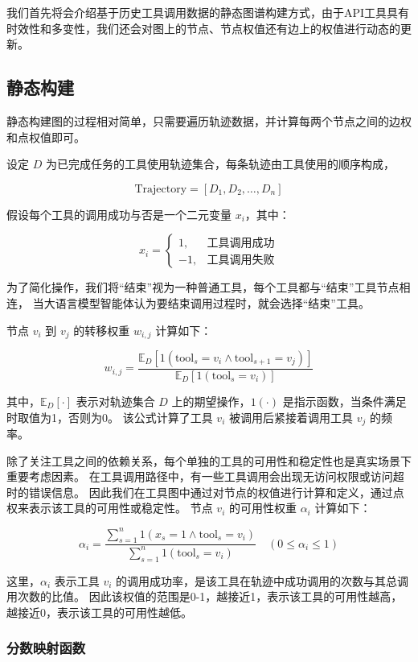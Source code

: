 我们首先将会介绍基于历史工具调用数据的静态图谱构建方式，由于API工具具有时效性和多变性，我们还会对图上的节点、节点权值还有边上的权值进行动态的更新。

\subsection{静态构建}

静态构建图的过程相对简单，只需要遍历轨迹数据，并计算每两个节点之间的边权和点权值即可。

设定 $D$ 为已完成任务的工具使用轨迹集合，每条轨迹由工具使用的顺序构成，

\[
\text{Trajectory} = [D_1, D_2, \ldots, D_n]
\]

假设每个工具的调用成功与否是一个二元变量 $x_i$，其中：

\[
x_i = 
\begin{cases} 
1, & \text{工具调用成功} \\
-1, & \text{工具调用失败}
\end{cases}
\]

为了简化操作，我们将“结束”视为一种普通工具，每个工具都与“结束”工具节点相连，
当大语言模型智能体认为要结束调用过程时，就会选择“结束”工具。

节点 $v_i$ 到 $v_j$ 的转移权重 $w_{i,j}$ 计算如下：

\[
w_{i,j} = \frac{\mathbb{E}_D[1(\text{tool}_s = v_i \land \text{tool}_{s+1} = v_j)]}{\mathbb{E}_D[1(\text{tool}_s = v_i)]}
\]

其中，$\mathbb{E}_D[\cdot]$ 表示对轨迹集合 $D$ 上的期望操作，$1(\cdot)$ 是指示函数，当条件满足时取值为1，否则为0。
该公式计算了工具 $v_i$ 被调用后紧接着调用工具 $v_j$ 的频率。

除了关注工具之间的依赖关系，每个单独的工具的可用性和稳定性也是真实场景下重要考虑因素。
在工具调用路径中，有一些工具调用会出现无访问权限或访问超时的错误信息。
因此我们在工具图中通过对节点的权值进行计算和定义，通过点权来表示该工具的可用性或稳定性。
节点 $v_i$ 的可用性权重 $\alpha_i$ 计算如下：

\[
\alpha_i = \frac{\sum_{s=1}^{n} 1(x_s = 1 \land \text{tool}_s = v_i)}{\sum_{s=1}^{n} 1(\text{tool}_s = v_i)} \quad (0 \leq \alpha_i \leq 1)
\]

这里，$\alpha_i$ 表示工具 $v_i$ 的调用成功率，是该工具在轨迹中成功调用的次数与其总调用次数的比值。
因此该权值的范围是0-1，越接近1，表示该工具的可用性越高，越接近0，表示该工具的可用性越低。

\subsubsection{分数映射函数}

